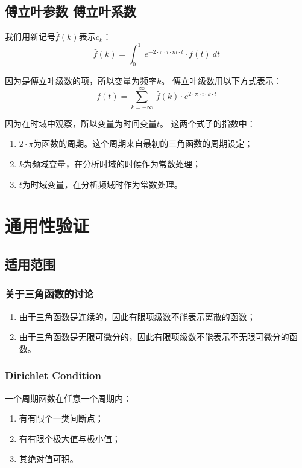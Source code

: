 \subsection{傅立叶参数 傅立叶系数}
我们用新记号$\hat{f}(k)$表示$c_k$：
\begin{equation}
	\hat{f}(k)=\int_0^1 \ e^{-2\cdot \pi\cdot i\cdot m\cdot t}\cdot f(t)\ dt
\end{equation}

因为是傅立叶级数的项，所以变量为频率$k$。
傅立叶级数用以下方式表示：
\begin{equation}
	f(t)=\sum\limits_{k=-\infty}^\infty\ \hat{f}(k)\cdot e^{2\cdot \pi\cdot i\cdot k\cdot t }
\end{equation}

因为在时域中观察，所以变量为时间变量$t$。
这两个式子的指数中：
\begin{enumerate}
	\item $2\cdot \pi$为函数的周期。这个周期来自最初的三角函数的周期设定；
	\item $k​$为频域变量，在分析时域的时候作为常数处理；
	\item $t$为时域变量，在分析频域时作为常数处理。
\end{enumerate}
\section{通用性验证}
\subsection{适用范围}
\subsubsection{关于三角函数的讨论}
\begin{enumerate}
	\item 由于三角函数是连续的，因此有限项级数不能表示离散的函数；
	\item 由于三角函数是无限可微分的，因此有限项级数不能表示不无限可微分的函数。
\end{enumerate}


\subsubsection{Dirichlet Condition}
一个周期函数在任意一个周期内：
\begin{enumerate}
	\item 有有限个一类间断点；
	\item 有有限个极大值与极小值；
	\item 其绝对值可积。
\end{enumerate}

